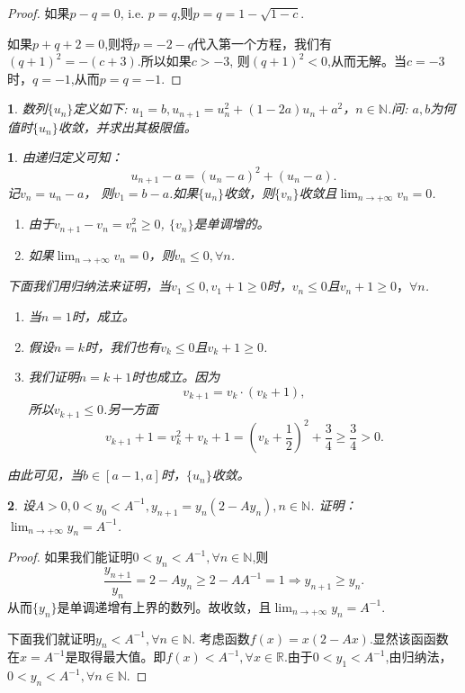 \documentclass[utf8]{book}
\newtheorem{example}{}[section]             %
\newtheorem{solution}{}
\begin{document}
\begin{proof}
如果$p-q = 0$, i.e. $p=q$,则$p=q= 1-\sqrt{1-c}$.

如果$p+q+2 = 0$,则将$p=-2-q$代入第一个方程，我们有$(q+1)^2 =-(c+3)$.所以如果$c>-3$, 则$(q+1)^2 < 0$,从而无解。当$c=-3$时，$q=-1$,从而$p=q=-1$.
\end{proof}
\begin{example}
数列$\{u_n\}$定义如下: $u_1=b,u_{n+1}=u_n^2+(1-2a)u_n+a^2$，$n\in\mathbb{N}$.问: $a,b$为何值时$\{u_n\}$收敛，并求出其极限值。
\end{example}
\begin{solution}
由递归定义可知：
$$u_{n+1}-a = (u_n-a)^2 + (u_n-a).$$
记$v_n = u_n-a$， 则$v_1 = b -a$.如果$\{u_n\}$收敛，则$\{v_n\}$收敛且$\displaystyle\lim_{n\to +\infty}v_n = 0$.
\renewcommand\labelenumi{\normalfont(\theenumi)}
\begin{enumerate}
\item 由于$v_{n+1}-v_{n} = v_n^2 \geq 0$, $\{v_n\}$是单调增的。
\item 如果$\displaystyle\lim_{n\to +\infty}v_n = 0$，则$v_n \leq 0, \forall n$.
\end{enumerate}
下面我们用归纳法来证明，当$v_1 \leq 0, v_1 + 1 \geq 0$时，$v_n \leq 0$且$v_n + 1 \geq 0，\forall n$.
\renewcommand\labelenumi{\normalfont(\theenumi)}
\begin{enumerate}
\item 当$n=1$时，成立。
\item 假设$n=k$时，我们也有$v_k \leq 0$且$v_k + 1 \geq 0$.
\item 我们证明$n=k+1$时也成立。因为$$v_{k+1} =v_k\cdot(v_k + 1),$$ 所以$v_{k+1} \leq 0$.另一方面$$v_{k+1} +1 = v^2_k + v_k + 1 = \left(v_k + \frac{1}{2}\right)^2 + \frac{3}{4} \geq \frac{3}{4} > 0.$$ 
\end{enumerate}
由此可见，当$b\in[a-1, a]$时，$\{u_n\}$收敛。
\end{solution}
\begin{example}
设$A > 0, 0< y_0 < A^{-1}, y_{n+1} = y_n(2-Ay_n), n\in\mathbb{N}$. 证明：$\displaystyle\lim_{n\to +\infty}y_{n}=A^{-1}$.
\end{example}
\begin{proof}如果我们能证明$0< y_n < A^{-1}, \forall n\in\mathbb{N}$,则
$$\frac{y_{n+1}}{y_n} = 2-Ay_n\geq 2-AA^{-1}=1\Rightarrow y_{n+1} \geq y_n.$$
从而$\{y_n\}$是单调递增有上界的数列。故收敛，且$\displaystyle\lim_{n\to +\infty}y_{n}=A^{-1}$.

下面我们就证明$y_n < A^{-1},\forall n\in\mathbb{N}$. 考虑函数$f(x)=x(2-Ax)$.显然该函函数在$x=A^{-1}$是取得最大值。即$f(x) < A^{-1},\forall x\in \mathbb{R}$.由于$0< y_1 < A^{-1}$,由归纳法， $0< y_n < A^{-1}, \forall n\in\mathbb{N}$.
\end{proof}
\end{document}
